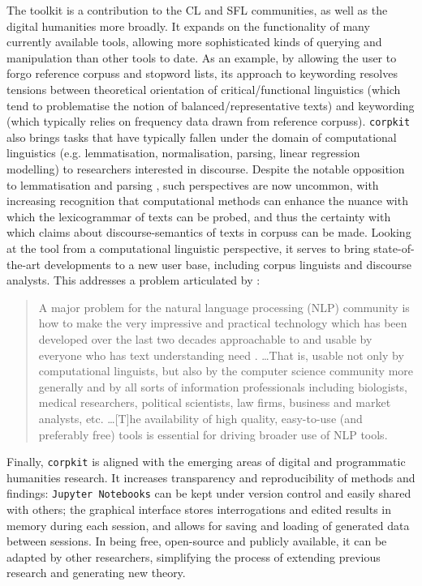 The toolkit is a contribution to the \gls{CL} and \gls{SFL} communities, as well as the digital humanities more broadly. It expands on the functionality of many currently available tools, allowing more sophisticated kinds of querying and manipulation than other tools to date. As an example, by allowing the user to forgo reference \glspl{corpus} and stopword lists, its approach to keywording resolves tensions between theoretical orientation of critical\slash functional linguistics (which tend to problematise the notion of balanced\slash representative texts) and keywording (which typically relies on frequency data drawn from reference \glspl{corpus}). \texttt{corpkit} also brings tasks that have typically fallen under the domain of computational linguistics (e.g. lemmatisation, normalisation, parsing, linear regression modelling) to researchers interested in discourse. Despite the notable opposition to lemmatisation and parsing \textcite[by e.g.][]{sinclair_trust_2004}, such perspectives are now uncommon, with increasing recognition that computational methods can enhance the nuance with which the \gls{lexicogrammar} of texts can be probed, and thus the certainty with which claims about \glspl{discourse-semantic} of texts in \glspl{corpus} can be made. Looking at the tool from a computational linguistic perspective, it serves to bring state\hyp{}of\hyp{}the\hyp{}art developments to a new user base, including corpus linguists and discourse analysts. This addresses a problem articulated by \citeauthor[p.~1]{de2008stanford}:

\begin{quote} \singlespacing \small
A major problem for the natural language processing (\gls{NLP}) community is how to make the very impressive and practical technology which has been developed over the last two decades approachable to and usable by everyone who has text understanding need \parencite*[p.~1]{de2008stanford}. \dots That is, usable not only by computational linguists, but also by the computer science community more generally and by all sorts of information professionals including biologists, medical researchers, political scientists, law firms, business and market analysts, etc. \dots [T]he availability of high quality, easy\hyp{}to\hyp{}use (and preferably free) tools is essential for driving broader use of \gls{NLP} tools.
\end{quote}

Finally, \texttt{corpkit} is aligned with the emerging areas of digital and programmatic humanities research. It increases transparency and reproducibility of methods and findings: \texttt{Jupyter Notebooks} can be kept under version control and easily shared with others; the graphical interface stores interrogations and edited results in memory during each session, and allows for saving and loading of generated data between sessions. In being free, open\hyp{}source and publicly available, it can be adapted by other researchers, simplifying the process of extending previous research and generating new theory.

